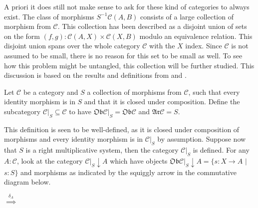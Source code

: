     A priori it does still not make sense to ask for these kind of categories to always exist. The class of morphisms $S^{-1}\mathcal{C}(A,B)$ consists of a large collection of morphism from $\mathcal{C}$. This collection has been described as a disjoint union of sets on the form $(f,g):\mathcal{C}(A,X)\times \mathcal{C}(X,B)$ modulo an equivalence relation. This disjoint union spans over the whole category $\mathcal{C}$ with the $X$ index. Since $\mathcal{C}$ is not assumed to be small, there is no reason for this set to be small as well. To see how this problem might be untangled, this collection will be further studied. This discussion is based on the results and definitions from \cite{zisman} and \cite{weibel}.

    \begin{definition}
        Let $\mathcal{C}$ be a category and $S$ a collection of morphisms from $\mathcal{C}$, such that every identity morphism is in $S$ and that it is closed under composition. Define the subcategory $\mathcal{C}|_{S} \subseteq \mathcal{C}$ to have $\mathfrak{Ob}\mathcal{C}|_{S} = \mathfrak{Ob}\mathcal{C}$ and $\mathfrak{Ar}\mathcal{C} = S$.
    \end{definition}

    This definition is seen to be well-defined, as it is closed under composition of morphisms and every identity morphism is in $\mathcal{C}|_{S}$ by assumption. Suppose now that $S$ is a right multiplicative system, then the category $\mathcal{C}|_{S}$ is defined. For any $A:\mathcal{C}$, look at the category $\mathcal{C}|_{S}\downarrow A$ which have objects $\mathfrak{Ob}\mathcal{C}|_{S}\downarrow A = \{s : X \rightarrow A$ $|$ $s : S\}$ and morphisms as indicated by the squiggly arrow in the commutative diagram below.
    
    \begin{center}
        $\stackrel{\delta_{A}}{\implies}$
    \end{center}

